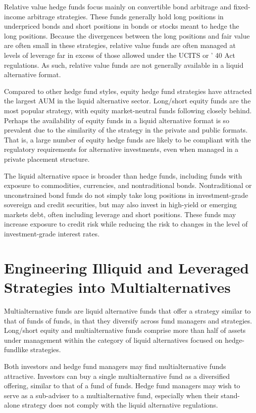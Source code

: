 \documentclass[11pt]{article}
\begin{document}
Relative value hedge funds focus mainly on convertible bond arbitrage and fixed-income arbitrage strategies. These funds generally hold long positions in underpriced bonds and short positions in bonds or stocks meant to hedge the long positions. Because the divergences between the long positions and fair value are often small in these strategies, relative value funds are often managed at levels of leverage far in excess of those allowed under the UCITS or ' 40 Act regulations. As such, relative value funds are not generally available in a liquid alternative format.

Compared to other hedge fund styles, equity hedge fund strategies have attracted the largest AUM in the liquid alternative sector. Long/short equity funds are the most popular strategy, with equity market-neutral funds following closely behind. Perhaps the availability of equity funds in a liquid alternative format is so prevalent due to the similarity of the strategy in the private and public formats. That is, a large number of equity hedge funds are likely to be compliant with the regulatory requirements for alternative investments, even when managed in a private placement structure.

The liquid alternative space is broader than hedge funds, including funds with exposure to commodities, currencies, and nontraditional bonds. Nontraditional or unconstrained bond funds do not simply take long positions in investment-grade sovereign and credit securities, but may also invest in high-yield or emerging markets debt, often including leverage and short positions. These funds may increase exposure to credit risk while reducing the risk to changes in the level of investment-grade interest rates.

\section*{Engineering Illiquid and Leveraged Strategies into Multialternatives}
Multialternative funds are liquid alternative funds that offer a strategy similar to that of funds of funds, in that they diversify across fund managers and strategies. Long/short equity and multialternative funds comprise more than half of assets under management within the category of liquid alternatives focused on hedge-fundlike strategies.

Both investors and hedge fund managers may find multialternative funds attractive. Investors can buy a single multialternative fund as a diversified offering, similar to that of a fund of funds. Hedge fund managers may wish to serve as a sub-adviser to a multialternative fund, especially when their stand-alone strategy does not comply with the liquid alternative regulations.
\end{document}
